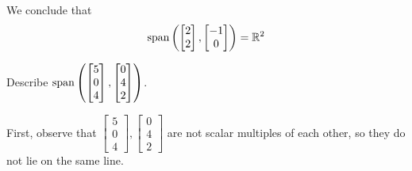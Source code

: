 \documentclass{ximera}
\begin{document}
\begin{example}
\begin{explanation}
We conclude that $$\textnormal{span}\left(\begin{bmatrix}2\\2\end{bmatrix}, \begin{bmatrix}-1\\0\end{bmatrix}\right)=\mathbb{R}^2$$
\end{explanation}
\end{example}

\begin{example}\label{ex:spanoftwovectors}
Describe $\textnormal{span}\left(\begin{bmatrix}5\\0\\4\end{bmatrix}, \begin{bmatrix}0\\4\\2\end{bmatrix}\right)$.
\begin{explanation}
First, observe that $\begin{bmatrix}5\\0\\4\end{bmatrix}, \begin{bmatrix}0\\4\\2\end{bmatrix}$ are not scalar multiples of each other, so they do not lie on the same line.  

\begin{image}
\end{image}


\end{explanation}
\end{example}
\end{document}
